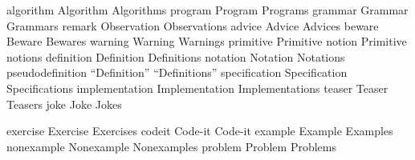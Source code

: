 \DefWords algorithm         {Algorithm} {Algorithms}
\DefWords program           {Program} {Programs}
\DefWords grammar           {Grammar} {Grammars}
\DefWords remark            {Observation} {Observations}
\DefWords advice            {Advice} {Advices}
\DefWords beware            {Beware} {Bewares}
\DefWords warning           {Warning} {Warnings}
\DefWords primitive         {Primitive notion} {Primitive notions}
\DefWords definition        {Definition} {Definitions}
\DefWords notation          {Notation} {Notations}
\DefWords pseudodefinition  {``Definition''} {``Definitions''}
\DefWords specification     {Specification} {Specifications}
\DefWords implementation    {Implementation} {Implementations}
\DefWords teaser            {Teaser} {Teasers}
\DefWords joke              {Joke} {Jokes}

\DefWords exercise          {Exercise} {Exercises}
\DefWords codeit            {Code-it} {Code-it}
\DefWords example           {Example} {Examples}
\DefWords nonexample        {Nonexample} {Nonexamples}
\DefWords problem           {Problem} {Problems}

